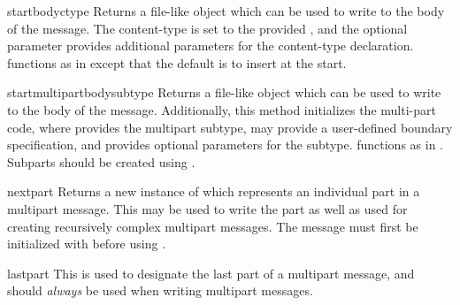\begin{methoddesc}[MimeWriter]{startbody}{ctype}
Returns a file-like object which can be used to write to the
body of the message.  The content-type is set to the provided
, and the optional parameter  provides
additional parameters for the content-type declaration. 
functions as in  except that the default is to
insert at the start.
\end{methoddesc}

\begin{methoddesc}[MimeWriter]{startmultipartbody}{subtype}
Returns a file-like object which can be used to write to the
body of the message.  Additionally, this method initializes the
multi-part code, where  provides the multipart subtype,
 may provide a user-defined boundary specification, and
 provides optional parameters for the subtype.
 functions as in .  Subparts should be
created using .
\end{methoddesc}

\begin{methoddesc}[MimeWriter]{nextpart}{}
Returns a new instance of  which represents an
individual part in a multipart message.  This may be used to write the 
part as well as used for creating recursively complex multipart
messages. The message must first be initialized with
 before using .
\end{methoddesc}

\begin{methoddesc}[MimeWriter]{lastpart}{}
This is used to designate the last part of a multipart message, and
should \emph{always} be used when writing multipart messages.
\end{methoddesc}
